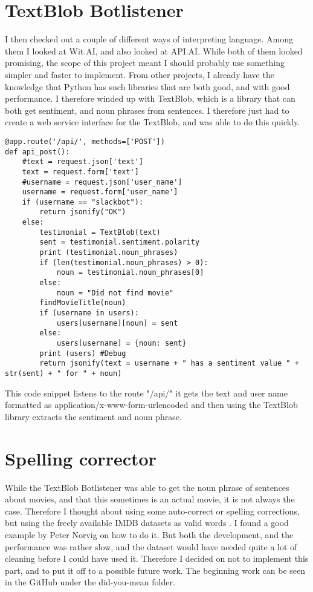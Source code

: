 \documentclass[11pt,fleqn]{book} %
\begin{document}
\section{TextBlob Botlistener}
I then checked out a couple of different ways of interpreting language. Among them I looked at Wit.AI\cite{Wit.aiWit.ai}, and also looked at API.AI\cite{API.AIConversationalAPI.AI}. While both of them looked promising, the scope of this project meant I should probably use something simpler and faster to implement. 
From other projects, I already have the knowledge that Python has such libraries that are both good, and with good performance. I therefore winded up with TextBlob, which is a library that can both get sentiment, and noun phrases\cite{WikipediaNounPhrase} from sentences. \cite{TextBlobTutorial:Documentation} 
I therefore just had to create a web service interface for the TextBlob, and was able to do this quickly.
\newpage
\begin{verbatim}
@app.route('/api/', methods=['POST'])
def api_post():
    #text = request.json['text']
    text = request.form['text']
    #username = request.json['user_name']
    username = request.form['user_name']
    if (username == "slackbot"):
        return jsonify("OK")
    else:
        testimonial = TextBlob(text)
        sent = testimonial.sentiment.polarity
        print (testimonial.noun_phrases)
        if (len(testimonial.noun_phrases) > 0):
            noun = testimonial.noun_phrases[0]
        else:
            noun = "Did not find movie"
        findMovieTitle(noun)
        if (username in users):
            users[username][noun] = sent
        else:
            users[username] = {noun: sent}
        print (users) #Debug
        return jsonify(text = username + " has a sentiment value " + str(sent) + " for " + noun)
\end{verbatim}
This code snippet listens to the route "/api/" it gets the text and user name formatted as application/x-www-form-urlencoded and then using the TextBlob library extracts the sentiment\cite{WikipediaSentimentAnalysis} and noun phrase\cite{WikipediaNounPhrase}.

\section{Spelling corrector}
While the TextBlob Botlistener was able to get the noun phrase\cite{WikipediaNounPhrase} of sentences about movies, and that this sometimes is an actual movie, it is not always the case. Therefore I thought about using some auto-correct or spelling corrections, but using the freely available IMDB datasets as valid words \cite{IMDbAlternativeInterfaces}. I found a good example by Peter Norvig \cite{NorvigHowCorrector} on how to do it.
But both the development, and the performance was rather slow, and the dataset would have needed quite a lot of cleaning before I could have used it. Therefore I decided on not to implement this part, and to put it off to a possible future work. The beginning work can be seen in the GitHub\cite{Github2017GitHubProject} under the did-you-mean folder.
\end{document}
